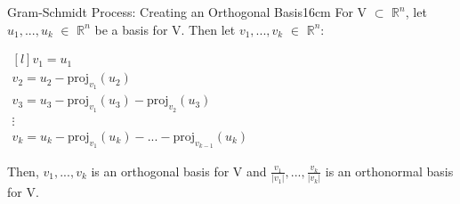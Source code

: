     \vspace{0.5cm}



    \begin{wtheorem}{Gram-Schmidt Process: Creating an Orthogonal Basis}{16cm}
        For V $\subset$ $\mathbb{R}^n$, let $u_1,...,u_k$ $\in$ $\mathbb{R}^n$
        be a basis for V. Then let $v_1,...,v_k$ $\in$ $\mathbb{R}^n$:

        \hspace{0.5cm}
        $\begin{matrix*}[l]
            v_1 = u_1 \\
            v_2 = u_2 - \text{proj}_{v_1}(u_2) \\
            v_3 = u_3 - \text{proj}_{v_1}(u_3) - \text{proj}_{v_2}(u_3) \\
            \vdots \\
            v_k = u_k - \text{proj}_{v_1}(u_k) - ... - \text{proj}_{v_{k-1}}(u_k)
        \end{matrix*}$

        Then, $v_1,...,v_k$ is an orthogonal basis for V
        and $\frac{v_1}{|v_1|},...,\frac{v_k}{|v_k|}$ is an orthonormal
        basis for V.
    \end{wtheorem}

